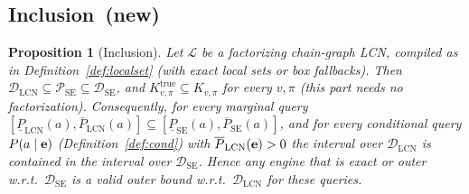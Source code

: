 \documentclass{article} %
\DeclareRobustCommand{\rev}[1]{{\color{blue}#1}}
\newcommand{\newtag}{\texorpdfstring{~\rev{(new)}}{}}
\newtheorem{proposition}{Proposition}
\newcommand{\lo}{\underline}
\newcommand{\hi}{\overline}
\newcommand{\DSE}{\mathcal{D}_{\mathrm{SE}}}
\newcommand{\DLCN}{\mathcal{D}_{\mathrm{LCN}}}
\begin{document}
\subsection{Inclusion\newtag}

\begin{proposition}[Inclusion]\label{prop:incl}
Let $\mathcal L$ be a factorizing chain-graph LCN, compiled as in Definition~\ref{def:localset} (with
exact local sets or box fallbacks). Then $\DLCN\subseteq\mathcal P_{\mathrm{SE}}\subseteq\DSE$, and
$K^{\mathrm{true}}_{v,\pi}\subseteq K_{v,\pi}$ for every $v,\pi$ (this part needs no factorization).
Consequently, for every marginal query $[\lo P_{\mathrm{LCN}}(a),\hi P_{\mathrm{LCN}}(a)]\subseteq
[\lo P_{\mathrm{SE}}(a),\hi P_{\mathrm{SE}}(a)]$, and for every conditional query $P(a\mid\mathbf{e})$
(Definition~\ref{def:cond}) with $\hi P_{\mathrm{LCN}}(\be)>0$ the interval over $\DLCN$ is contained
in the interval over $\DSE$. Hence any engine that is exact or outer w.r.t.\ $\DSE$ is a valid
\emph{outer} bound w.r.t.\ $\DLCN$ for these queries.
\end{proposition}
\end{document}

